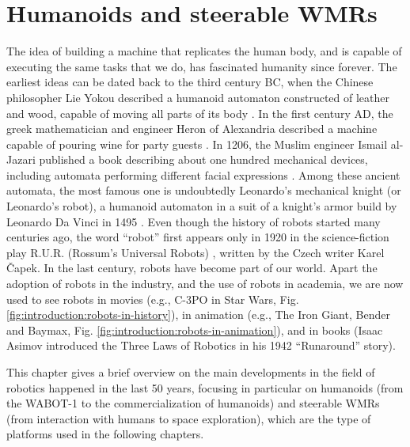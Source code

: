 \chapter{Humanoids and steerable WMRs}
\label{ch:humanoids-and-swmrs}
The idea of building a machine that replicates the human body, and is capable 
of executing the same tasks that we do, has fascinated humanity since forever.
The earliest ideas can be dated back to the third century BC, when the 
Chinese philosopher Lie Yokou described a humanoid automaton constructed of 
leather and wood, capable of moving all parts of its body
\cite{Needham1956ScienceandCivilisationinChinaVol2}. In the first century AD,
the greek mathematician and engineer Heron of Alexandria described a machine 
capable of pouring wine for party guests \cite{Alexandria2015Pneumatica}.
In 1206, the Muslim engineer Ismail al-Jazari published a book describing 
about one hundred mechanical devices, including automata performing different 
facial expressions \cite{AlJarari1206BookofKnowledge}. Among these ancient
automata, the most famous one is undoubtedly Leonardo's mechanical knight 
(or Leonardo's robot), a humanoid automaton in a suit of a knight's armor
build by Leonardo Da Vinci in 1495 \cite{Moran2006TheDaVinciRobot}.
Even though the history of robots started many centuries ago, the word ``robot''
first appears only in 1920 in the science-fiction play R.U.R.
(Rossum's Universal Robots) \cite{Capek1920RUR}, written by the Czech writer
Karel {\v C}apek.
In the last century, robots have become part of our world. Apart the adoption 
of robots in the industry, and the use of robots in academia, we are now 
used to see robots in movies (e.g., C-3PO in Star Wars,
Fig. \ref{fig:introduction:robots-in-history}), in animation (e.g., The Iron
Giant, Bender and Baymax, Fig.
\ref{fig:introduction:robots-in-animation}), and in books (Isaac Asimov
introduced the Three Laws of Robotics in his 1942 ``Runaround'' story).

This chapter gives a brief overview on the main developments in the field of 
robotics happened in the last 50 years, focusing in particular on humanoids
(from the WABOT-1 to the commercialization of humanoids)
and steerable WMRs (from interaction with humans to space exploration),
which are the type of platforms used in the following chapters.

